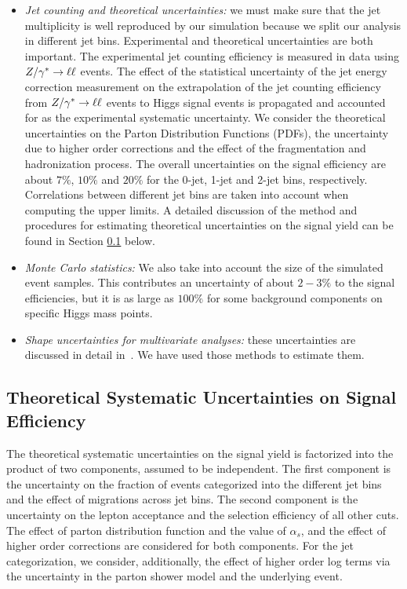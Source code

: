 \begin{itemize}
\item {\it Jet counting and theoretical uncertainties:} 
we must make sure that the jet multiplicity is well reproduced by our 
simulation because we split our analysis in different jet bins. 
Experimental and theoretical uncertainties are both important.
The experimental jet counting efficiency is measured in data 
using $Z/\gamma^*\to\ell\ell$ events. The effect of the statistical uncertainty 
of the jet energy correction measurement on the extrapolation
of the jet counting efficiency from $Z/\gamma^*\to\ell\ell$ events to Higgs signal
events is propagated and accounted for as the experimental 
systematic uncertainty. 
We consider the theoretical uncertainties on the Parton Distribution Functions (PDFs), 
the uncertainty due to higher order corrections and the effect of the fragmentation and 
hadronization process. The overall uncertainties on the signal efficiency are 
about $7\%$, $10\%$ and $20\%$ for the 0-jet, 1-jet and 2-jet bins, respectively.
Correlations between different jet bins are taken into account when computing
the upper limits. A detailed discussion of the method and procedures for estimating
theoretical uncertainties on the signal yield can be found in 
Section \ref{sec:theorySystematicsSignal} below.

\item {\it Monte Carlo statistics:} We also take into account the 
size of the simulated event samples. 
This contributes an uncertainty of about $2-3\%$ to the signal
efficiencies, but it is as large as $100\%$ for some background components on specific
Higgs mass points.

\item {\it Shape uncertainties for multivariate analyses:} these uncertainties 
are discussed in detail in~\cite{MVASyst}. We have used those methods 
to estimate them.
\end{itemize}

\subsection{Theoretical Systematic Uncertainties on Signal Efficiency}
\label{sec:theorySystematicsSignal}
The theoretical systematic uncertainties on the signal yield is factorized into the
product of two components, assumed to be independent. The first component is the uncertainty
on the fraction of events categorized into the different jet bins and the effect
of migrations across jet bins. The second component is the uncertainty
on the lepton acceptance and the selection efficiency of all other cuts. The effect of
parton distribution function and the value of $\alpha_{s}$, and the effect of 
higher order corrections are considered for both components. For the jet categorization,
we consider, additionally, the effect of higher order log terms via the uncertainty in the 
parton shower model and the underlying event.


